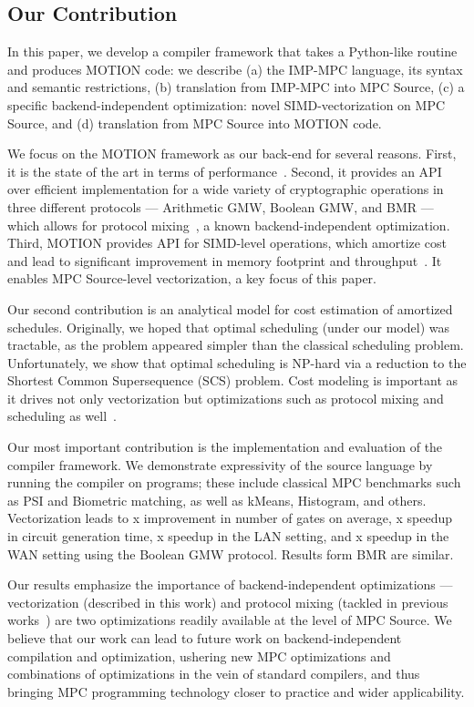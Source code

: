 \subsection{Our Contribution} In this paper, we develop a compiler framework that takes a Python-like routine and produces MOTION code: we describe (a) the IMP-MPC language, its syntax and semantic restrictions, (b) translation from IMP-MPC into MPC Source, (c) a specific backend-independent optimization: novel SIMD-vectorization on MPC Source, and (d) translation from MPC Source into MOTION code. %

We focus on the MOTION framework as our back-end for several reasons. First, it is the state of the art in terms of performance~\cite{Braun:2022}. Second, it provides an API over efficient implementation for a wide variety of cryptographic operations in three different protocols ---  Arithmetic GMW, Boolean GMW, and BMR --- which allows for protocol mixing~\cite{Ishaq:2019, Fang:2022}, a known backend-independent optimization. Third, MOTION provides API for SIMD-level operations, which amortize cost and lead to significant improvement in memory footprint and
throughput~\cite{NDSS:DemSchZoh15, CCS:ABFKLO18, Braun:2022}. It enables MPC Source-level vectorization, a key focus of this paper.

Our second contribution is an analytical model for cost estimation of amortized schedules. Originally, we hoped that optimal scheduling (under our model) was tractable, as the problem
appeared simpler than the classical scheduling problem. Unfortunately, we show that optimal scheduling is NP-hard via a reduction to the Shortest Common Supersequence (SCS) problem.
Cost modeling is important as it drives not only vectorization but optimizations such as protocol mixing and scheduling as well~\cite{Ishaq:2019, Fang:2022}.

Our most important contribution is the implementation and evaluation of the compiler framework. We demonstrate expressivity of the source language by running the compiler on  programs; these include classical MPC benchmarks such as PSI and Biometric matching, as well as kMeans, Histogram, and others. Vectorization leads to x improvement in number of gates on average, x speedup in circuit generation time, x speedup in the LAN setting, and x speedup in the WAN setting using the Boolean GMW protocol. Results form BMR are similar.

Our results emphasize the importance of backend-independent optimizations --- vectorization (described in this work) and protocol mixing (tackled in previous works~\cite{CCS:BDKKS18,Ishaq:2019, Fang:2022}) are two optimizations readily available at the level of MPC Source. We believe that our work can lead to future work on backend-independent compilation and optimization, ushering new MPC optimizations and combinations of optimizations in the vein of standard compilers, and thus bringing MPC programming technology closer to practice and wider applicability.


